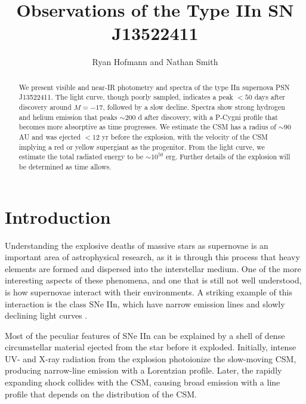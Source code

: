 \documentclass[iop]{emulateapj}
\begin{document}
\title{Observations of the Type IIn SN J13522411}

\author{Ryan Hofmann and Nathan Smith}

\begin{abstract}
We present visible and near-IR photometry and spectra of the type IIn supernova PSN J13522411. The light curve, though poorly sampled, indicates a peak $<50$ days after discovery around $M = -17$, followed by a slow decline. Spectra show strong hydrogen and helium emission that peaks $\sim200$ d after discovery, with a P-Cygni profile that becomes more absorptive as time progresses. We estimate the CSM has a radius of $\sim90$ AU and was ejected $<12$ yr before the explosion, with the velocity of the CSM implying a red or yellow supergiant as the progenitor. From the light curve, we estimate the total radiated energy to be $\sim10^{50}$ erg. Further details of the explosion will be determined as time allows.
\end{abstract}

\section{Introduction}
Understanding the explosive deaths of massive stars as supernovae is an important area of astrophysical research, as it is through this process that heavy elements are formed and dispersed into the interstellar medium. One of the more interesting aspects of these phenomena, and one that is still not well understood, is how supernovae interact with their environments. A striking example of this interaction is the class SNe IIn, which have narrow emission lines and slowly declining light curves \citep{Fil97}.

Most of the peculiar features of SNe IIn can be explained by a shell of dense circumstellar material ejected from the star before it exploded. Initially, intense UV- and X-ray radiation from the explosion photoionize the slow-moving CSM, producing narrow-line emission with a Lorentzian profile. Later, the rapidly expanding shock collides with the CSM, causing broad emission with a line profile that depends on the distribution of the CSM.
\end{document}
